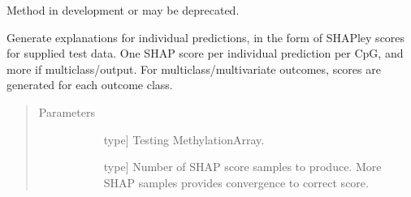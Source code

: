 \documentclass[letterpaper,10pt,english]{sphinxmanual}
\begin{document}
\begin{fulllineitems}
\begin{fulllineitems}
\begin{quote}
\begin{description}
\begin{description}
\end{description}

\end{description}\end{quote}

\end{fulllineitems}


\begin{fulllineitems}
\label{\detokenize{index:methylnet.interpretation_classes.CpGExplainer.return_shapley_predictions}}
Method in development or may be deprecated.

\end{fulllineitems}


\begin{fulllineitems}
\label{\detokenize{index:methylnet.interpretation_classes.CpGExplainer.return_shapley_scores}}
Generate explanations for individual predictions, in the form of SHAPley scores for supplied test data.
One SHAP score per individual prediction per CpG, and more if multiclass/output.
For multiclass/multivariate outcomes, scores are generated for each outcome class.
\begin{quote}\begin{description}
\item[{Parameters}] \leavevmode\begin{description}
\item[{}] \leavevmode{[}type{]}
Testing MethylationArray.

\item[{}] \leavevmode{[}type{]}
Number of SHAP score samples to produce. More SHAP samples provides convergence to correct score.


\end{description}
\end{description}
\end{quote}
\end{fulllineitems}
\end{fulllineitems}
\end{document}
